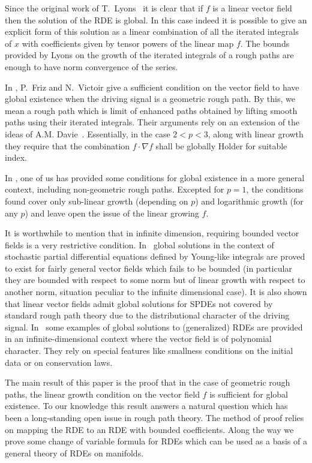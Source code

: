 \documentclass[a4paper,12pt]{article}
\theoremstyle{definition}
\begin{document}
Since the original work of T.~Lyons~\cite{lyons98a} it is clear that if $f$ is a linear vector field then the solution of the RDE is global. In this case indeed it is possible to give an explicit form of this solution as a linear combination of all the iterated integrals of $x$ with coefficients given by tensor powers of the linear map $f$. The bounds provided by Lyons on the growth of the iterated integrals of a rough paths are enough to have norm convergence of the series.

In \cite{friz06c}, P.~Friz and N.~Victoir give a sufficient condition on the vector field 
to have global existence when the driving signal is a geometric rough path.
By this, we mean a rough path 
which is limit of enhanced paths obtained by lifting smooth paths
using their iterated integrals. Their arguments rely on an extension
of the ideas of A.M. Davie~\cite{davie05a}. Essentially, in the case $2<p<3$, along with linear growth they require that  the combination $f \cdot \nabla f$ shall be globally Holder for suitable index.

In \cite{lejay09a}, one of us has provided some conditions for global existence
in a more general context, including non-geometric rough paths.
Excepted for $p=1$, the conditions found cover only sub-linear
growth (depending on $p$) and logarithmic growth (for any $p$) and leave open
the issue of the linear growing $f$.


It is worthwhile to mention that in infinite dimension, requiring bounded
vector fields is a very restrictive condition. In~\cite{gubinelli-tindel}
global solutions  in the context of stochastic partial differential equations
defined by Young-like integrals are proved to exist for fairly general vector
fields which fails to be bounded (in particular they are bounded with respect
to some norm but of linear growth with respect to another norm, situation
peculiar to the infinite dimensional case). It is also shown that linear vector
fields admit global solutions for SPDEs not  covered by standard rough path
theory due to the distributional character of the driving signal.
In~\cite{rooted-ns,kdv} some examples of global solutions to (generalized) RDEs
are provided  in an infinite-dimensional context where the vector field is of
polynomial character. They rely on special features like smallness conditions
on the initial data or on conservation laws. 


\medskip
The main result of this paper is the proof  that in the case of geometric rough paths, the linear growth condition on the vector field $f$ is sufficient for global existence. To our knowledge this result answers a natural question which has been a long-standing open issue in rough path theory.
The method of proof relies on mapping the RDE to an RDE with bounded coefficients. Along the way we  prove some change of variable formula for RDEs which can be used as a basis of a general theory of RDEs on manifolds.
\end{document}
